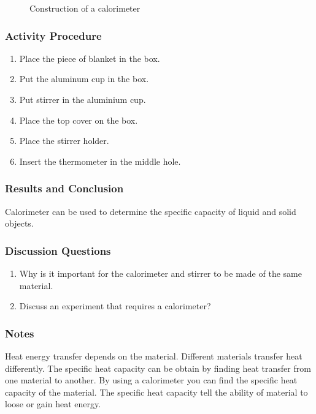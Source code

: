 \begin{figure}
\begin{center}
\def\svgwidth{2cm}

\caption{Construction of a calorimeter}
\label{fig:calorimeter}
\end{center}
\end{figure}

\subsubsection*{Activity Procedure}
\begin{enumerate}
\item{Place the piece of blanket in the box.}
\item{Put the aluminum cup in the box.}
\item{Put stirrer in the aluminium cup.}
\item{Place the top cover on the box.}
\item{Place the stirrer holder.}
\item{Insert the thermometer in the middle hole.}
\end{enumerate}

\subsubsection*{Results and Conclusion}
Calorimeter can be used to determine the specific capacity of liquid and solid objects.

\subsubsection*{Discussion Questions}
\begin{enumerate}
\item{Why is it important for the calorimeter and stirrer to be made of the same material.}
\item{Discuss an experiment that requires a calorimeter?}
\end{enumerate}

\subsubsection*{Notes}
Heat energy transfer depends on the material. Different materials transfer heat differently. The specific heat capacity can be obtain by finding heat transfer from one material to another. By using a calorimeter 
you can find the specific heat capacity of the material. The specific heat capacity tell the ability of material to loose or gain heat energy.

